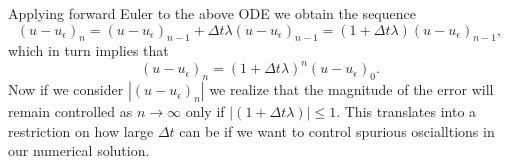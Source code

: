 Applying forward Euler to the above ODE we obtain the sequence 
\begin{equation*}
    (u - u_\epsilon)_n = (u - u_\epsilon)_{n-1} 
    + \Delta t \lambda (u - u_\epsilon)_{n-1} 
    = ( 1 + \Delta t \lambda) ( u - u_\epsilon)_{n-1}, 
\end{equation*}
which in turn implies that 
\begin{equation*}
    (u - u_\epsilon)_n = (1 + \Delta t \lambda)^n (u - u_\epsilon)_0.
\end{equation*}
Now if we consider $| (u - u_\epsilon)_n|$ we realize that the 
magnitude of the error will remain controlled as $n \to \infty$ only if 
$| (1 + \Delta t \lambda) | \le 1$. This translates into a restriction
on how large $\Delta t$ can be if we want to control spurious 
oscialltions in our numerical solution.
